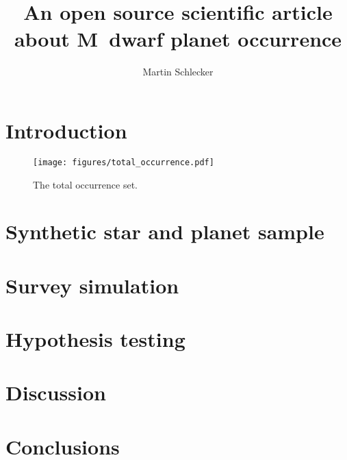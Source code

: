 \documentclass[twocolumn]{aastex631}
\begin{document}
\title{An open source scientific article about M~dwarf planet occurrence}

\author[0000-0001-8355-2107]{Martin Schlecker}


\begin{abstract}
    \blindtext
\end{abstract}

\section{Introduction}
\Blindtext[4]

\begin{figure*}
    \begin{centering}
        \texttt{[image: figures/total\_occurrence.pdf]}
        \caption{The total occurrence set.}
        \label{fig:total_occurrence}
    \end{centering}
\end{figure*}

\section{Synthetic star and planet sample}


\section{Survey simulation}


\section{Hypothesis testing}


\section{Discussion}


\section{Conclusions}
\end{document}
